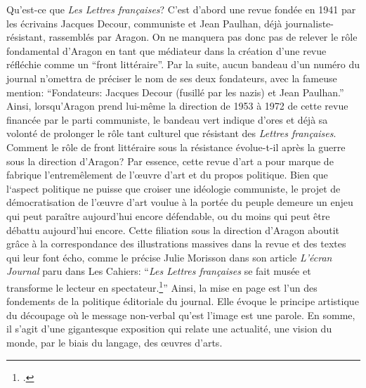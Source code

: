 Qu'est-ce que \emph{Les Lettres françaises}? C'est d'abord une revue fondée en 1941 par les écrivains Jacques Decour, communiste et Jean Paulhan, déjà journaliste-résistant, rassemblés par Aragon. On ne manquera pas donc pas de relever le rôle fondamental d'Aragon en tant que médiateur dans la création d'une revue réfléchie comme un \enquote{front littéraire}. Par la suite, aucun bandeau d'un numéro du journal n'omettra de préciser le nom de ses deux fondateurs, avec la fameuse mention: \enquote{Fondateurs: Jacques Decour (fusillé par les nazis) et Jean Paulhan.} Ainsi, lorsqu'Aragon prend lui-même la direction de 1953 à 1972 de cette revue financée par le parti communiste, le bandeau vert indique d'ores et déjà sa volonté de prolonger le rôle tant culturel que résistant des \emph{Lettres françaises}. Comment le rôle de front littéraire sous la résistance évolue-t-il après la guerre sous la direction d'Aragon? Par essence, cette revue d'art a pour marque de fabrique l'entremêlement de l'\oe{}uvre d'art et du propos politique. Bien que l‘aspect politique ne puisse que croiser une idéologie communiste, le projet de démocratisation de l'\oe{}uvre d'art voulue à la portée du peuple demeure un enjeu qui peut paraître aujourd'hui encore défendable, ou du moins qui peut être débattu aujourd'hui encore. Cette filiation sous la direction d'Aragon aboutit grâce à la correspondance des illustrations massives dans la revue et des textes qui leur font écho, comme le précise Julie Morisson dans son article \emph{L'écran Journal} paru dans Les Cahiers: \enquote{\emph{Les Lettres françaises} se fait musée et transforme le lecteur en spectateur.\footcite[p. 169--172]{cahiers}} Ainsi, la mise en page est l'un des fondements de la politique éditoriale du journal. Elle évoque le principe artistique du découpage où le message non-verbal qu'est l'image est une parole. En somme, il s'agit d'une gigantesque exposition qui relate une actualité, une vision du monde, par le biais du langage, des \oe{}uvres d'arts.

